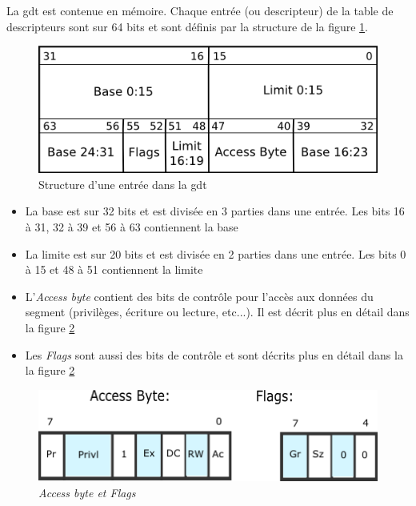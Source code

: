 La \acrshort{gdt} est contenue en mémoire. Chaque entrée (ou descripteur) de
la table de descripteurs sont sur 64 bits et sont définis par la structure de
la figure \ref{gdt_entry}.\cite{ref14}

\begin{figure}[!h]
  \centering
  \includegraphics[scale=0.75]{images/gdt_entry.png}
  \caption{Structure d'une entrée dans la \acrshort{gdt}}
  \label{gdt_entry}
\end{figure}

\begin{itemize}[label=\textbullet]
	\item La base est sur 32 bits et est divisée en 3 parties dans une entrée.
    Les bits 16 à 31, 32 à 39 et 56 à 63 contiennent la base
	\item La limite est sur 20 bits et est divisée en 2 parties dans une entrée.
    Les bits 0 à 15 et 48 à 51 contiennent la limite
	\item L'\textit{Access byte} contient des bits de contrôle pour l'accès aux données
    du segment (privilèges, écriture ou lecture, etc...). Il est décrit plus en détail
    dans la figure \ref{gdt_bits}
    \item Les \textit{Flags} sont aussi des bits de contrôle et sont décrits plus
    en détail dans la la figure \ref{gdt_bits}\cite{ref14}
\end{itemize}

\begin{figure}[!h]
  \centering
  \includegraphics[scale=0.75]{images/gdt_bits.png}
  \caption{\textit{Access byte et Flags}}
  \label{gdt_bits}
\end{figure}

